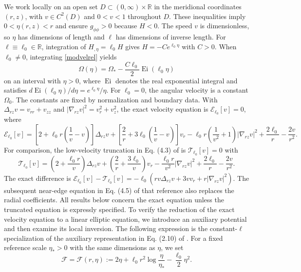 \documentclass[amsmath,amsfonts,amssymb,aps,pra,superscriptaddress,10pt]{revtex4-2}
\numberwithin{equation}{section}
\theoremstyle{plain}
\theoremstyle{definition}
\theoremstyle{remark}
\theoremstyle{definition}
\newcommand{\ellzero}{\ell_0}
\newcommand{\Drz}{\Delta_{rz}}
\newcommand{\gradRZ}{\nabla_{rz}}
\newcommand{\ET}{\mathcal T_{\ellzero}}
\newcommand{\EE}{\mathcal E_{\ellzero}}
\begin{document}
We work locally on an open set $D\subset(0,\infty)\times\mathbb{R}$ in the meridional coordinates $(r,z)$, with $v\in C^2(D)$ and $0<v<1$ throughout $D$. These inequalities imply $0<\eta(r,z)<r$ and ensure $g_{\phi\phi}>0$ because $H<0$. The speed $v$ is dimensionless, so $\eta$ has dimensions of length and $\ell$ has dimensions of inverse length. For $\ell\equiv\ellzero\in\mathbb{R}$, integration of $H_{,\eta}=\ellzero H$ gives $H=-Ce^{\ellzero\eta}$ with $C>0$. When $\ellzero\neq 0$, integrating \eqref{modvelrel} yields
\begin{equation}\label{constantellomega}
\Omega(\eta)=\Omega_*-\frac{C\ellzero}{2}\operatorname{Ei}(\ellzero\eta)
\end{equation}
on an interval with $\eta>0$, where $\operatorname{Ei}$ denotes the real exponential integral and satisfies $d\operatorname{Ei}(\ellzero\eta)/d\eta=e^{\ellzero\eta}/\eta$. For $\ellzero=0$, the angular velocity is a constant $\Omega_0$. The constants are fixed by normalization and boundary data. With $\Drz v=v_{rr}+v_{zz}$ and $|\gradRZ v|^2=v_r^2+v_z^2$, the exact velocity equation is $\EE[v]=0$, where
\begin{equation}\label{exactconstell}
\EE[v]={}\left[2+\ellzero r\left(\frac{1}{v}-v\right)\right]\Drz v
+\left[\frac{2}{r}+3\ellzero\left(\frac{1}{v}-v\right)\right]v_r-\ellzero r\left(\frac{1}{v^2}+1\right)|\gradRZ v|^2+\frac{2\ellzero}{r}-\frac{2v}{r^2}.
\end{equation}
For comparison, the low-velocity truncation in Eq. (4.3) of \cite{Astesiano2022EPJC} is $\ET[v]=0$ with
\begin{equation}
\ET[v]=\left(2+\frac{\ellzero r}{v}\right)\Drz v+\left(\frac{2}{r}+\frac{3\ellzero}{v}\right)v_r-\frac{\ellzero r}{v^2}|\gradRZ v|^2+\frac{2\ellzero}{r}-\frac{2v}{r^2}.
\end{equation}
The exact difference is $\EE[v]-\ET[v]=-\ellzero\left(rv\Drz v+3vv_r+r|\gradRZ v|^2\right)$. The subsequent near-edge equation in Eq. (4.5) of that reference also replaces the radial coefficients. All results below concern the exact equation unless the truncated equation is expressly specified. To verify the reduction of the exact velocity equation to a linear elliptic equation, we introduce an auxiliary potential and then examine its local inversion. The following expression is the constant-$\ell$ specialization of the auxiliary representation in Eq. (2.10) of \cite{Astesiano2022EPJC}. For a fixed reference scale $\eta_*>0$ with the same dimensions as $\eta$, we set
\begin{equation}\label{Phiell}
\mathcal{F}=\mathcal{F}(r,\eta):=2\eta+\ellzero r^2\log{\frac{\eta}{\eta_*}}
-\frac{\ellzero}{2}\eta^2.
\end{equation}
\end{document}
